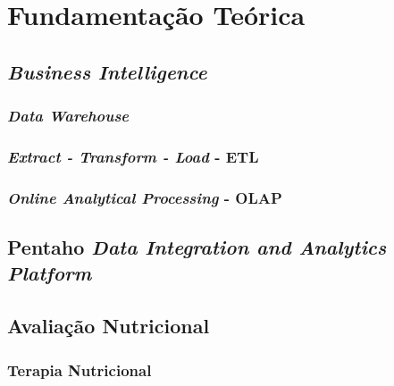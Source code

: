 \chapter{Fundamentação Teórica}\label{cap_exemplos}

\section{\textit{Business Intelligence}}
\subsection{\textit{Data Warehouse}}
\subsection{\textit{Extract - Transform - Load} - ETL}
\subsection{\textit{Online Analytical Processing} - OLAP}

\section{Pentaho \textit{Data Integration and Analytics Platform}}

\section{Avaliação Nutricional}

\subsection{Terapia Nutricional}
